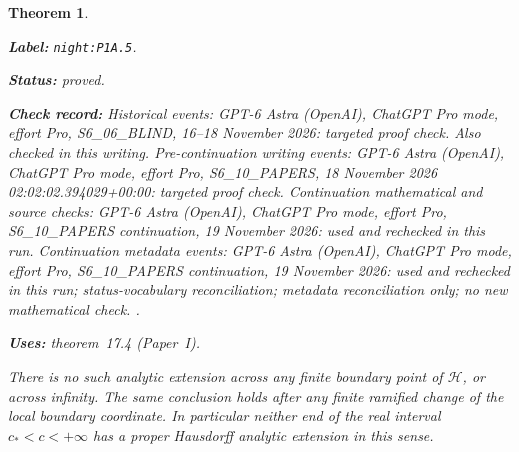 \documentclass[11pt,a4paper]{article}
\newtheorem{theorem}{Theorem}[section]
\theoremstyle{definition}
\newcommand{\StatementRecord}[4]{\par\smallskip\begingroup\upshape\raggedright\noindent\textbf{Label:} \nolinkurl{#1}.\par\noindent\textbf{Status:} #2.\par\noindent\textbf{Check record:} #3.\par\noindent\textbf{Uses:} #4.\par\endgroup\smallskip}
\newcommand{\ExternalPaperRef}[3]{\ifmmode\text{\upshape #1#2 (Paper~#3)}\else #1#2 (Paper~#3)\fi}
\begin{document}
\begin{theorem}\label{night:P1A.5}
\StatementRecord{night:P1A.5}{proved}{Historical events: GPT-6 Astra (OpenAI), ChatGPT Pro mode, effort Pro, S6\_06\_BLIND, 16--18 November 2026: targeted proof check. Also checked in this writing. Pre-continuation writing events: GPT-6 Astra (OpenAI), ChatGPT Pro mode, effort Pro, S6\_10\_PAPERS, 18 November 2026 02:02:02.394029+00:00: targeted proof check. Continuation mathematical and source checks: GPT-6 Astra (OpenAI), ChatGPT Pro mode, effort Pro, S6\_10\_PAPERS continuation, 19 November 2026: used and rechecked in this run. Continuation metadata events: GPT-6 Astra (OpenAI), ChatGPT Pro mode, effort Pro, S6\_10\_PAPERS continuation, 19 November 2026: used and rechecked in this run; status-vocabulary reconciliation; metadata reconciliation only; no new mathematical check. }{\ExternalPaperRef{theorem~}{17.4}{I}}
There is no such analytic extension across any finite boundary
point of $\mathcal H$, or across infinity. The same conclusion
holds after any finite ramified change of the local boundary
coordinate. In particular neither end of the real interval
$c_*<c<+\infty$ has a proper Hausdorff analytic extension in
this sense.
\end{theorem}
\end{document}
